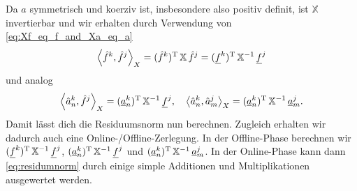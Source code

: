 Da $a$ symmetrisch und koerziv ist, insbesondere also positiv definit, ist $\mathbb{X}$ invertierbar und wir erhalten durch Verwendung von \eqref{eq:Xf_eq_f_and_Xa_eq_a}
\begin{equation}
    \left\langle\hat f^k,\hat f^j\right\rangle_X = (\hat f^k)^{\mathrm T} \, \mathbb{X} \, \hat f^j = (\underline f^k)^{\mathrm T} \, \mathbb{X}^{-1} \, \underline f^j
\end{equation}
und analog
\begin{equation}
    \left\langle\hat a^k_n,\hat f^j\right\rangle_X = (\underline a^k_n)^{\mathrm T} \, \mathbb{X}^{-1} \, \underline f^j,
    \quad \left\langle\hat a^k_n,\hat a^j_m\right\rangle_X = (\underline a^k_n)^{\mathrm T} \, \mathbb{X}^{-1} \, \underline a^j_m.
\end{equation}
Damit lässt dich die Residuumsnorm nun berechnen. Zugleich erhalten wir dadurch auch eine Online-/Offline-Zerlegung. In der Offline-Phase berechnen wir $(\underline f^k)^{\mathrm T} \, \mathbb{X}^{-1} \, \underline f^j$, $(\underline a^k_n)^{\mathrm T} \, \mathbb{X}^{-1} \, \underline f^j$ und $(\underline a^k_n)^{\mathrm T} \, \mathbb{X}^{-1} \, \underline a^j_m$. In der Online-Phase kann dann \eqref{eq:residumnorm} durch einige simple Additionen und Multiplikationen ausgewertet werden.




